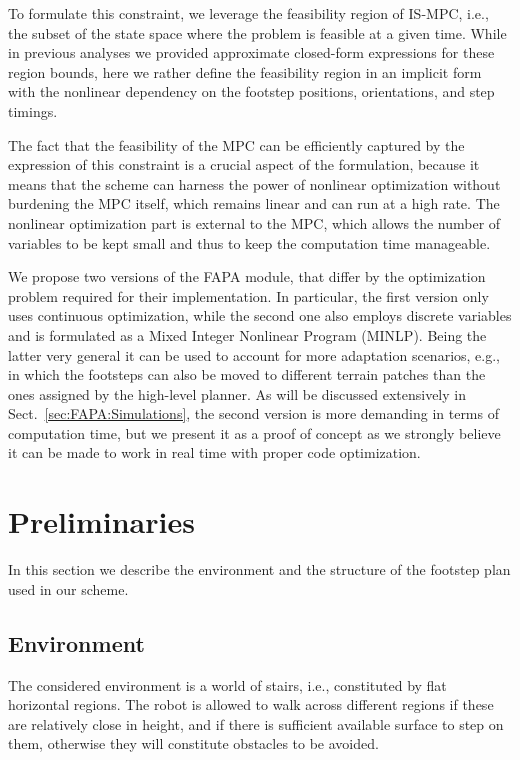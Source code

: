 To formulate this constraint, we leverage the feasibility region of IS-MPC, i.e., the subset of the state space where the problem is feasible at a given time. While in previous analyses we provided approximate closed-form expressions for these region bounds, here we rather define the feasibility region in an implicit form with the nonlinear dependency on the footstep positions, orientations, and step timings.

The fact that the feasibility of the MPC can be efficiently captured by the expression of this constraint is a crucial aspect of the formulation, because it means that the scheme can harness the power of nonlinear optimization without burdening the MPC itself, which remains linear and can run at a high rate. The nonlinear optimization part is external to the MPC, which allows the number of variables to be kept small and thus to keep the computation time manageable.

We propose two versions of the FAPA module, that differ by the optimization problem required for their implementation. In particular, the first version only uses continuous optimization, while the second one also employs discrete variables and is formulated as a Mixed Integer Nonlinear Program (MINLP). Being the latter very general it can be used to account for more adaptation scenarios, e.g., in which the footsteps can also be moved to different terrain patches than the ones assigned by the high-level planner. As will be discussed extensively in Sect.~\ref{sec:FAPA:Simulations}, the second version is more demanding in terms of computation time, but we present it as a proof of concept as we strongly believe it can be made to work in real time with proper code optimization.

\section{Preliminaries}
\label{sec:FAPA:Preliminaries}

In this section we describe the environment and the structure of the footstep plan used in our scheme.

\subsection{Environment}

The considered environment is a world of stairs, i.e., constituted by flat horizontal regions. The robot is allowed to walk across different regions if these are relatively close in height, and if there is sufficient available surface to step on them, otherwise they will constitute obstacles to be avoided.

